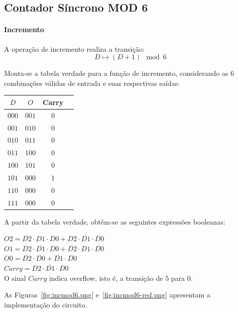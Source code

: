 \subsection{Contador Síncrono MOD 6}

\paragraph{Incremento}

A operação de incremento realiza a transição:
\[
D \mapsto (D + 1) \mod 6
\]

Monta-se a tabela verdade para a função de incremento, considerando as 6 combinações válidas de entrada e suas respectivas saídas:

\begin{center}
\begin{tabular}{c|ccc}
$D$ & $O$ & Carry \\
\hline
$000$ & $001$ & $0$ \\
$001$ & $010$ & $0$ \\
$010$ & $011$ & $0$ \\
$011$ & $100$ & $0$ \\
$100$ & $101$ & $0$ \\
$101$ & $000$ & $1$ \\
$110$ & $000$ & $0$ \\
$111$ & $000$ & $0$ \\
\end{tabular}
\end{center}

A partir da tabela verdade, obtêm-se as seguintes expressões booleanas:

$O2 =  \overline{D2}  \cdot D1 \cdot D0+D2 \cdot  \overline{D1}  \cdot  \overline{D0} $~\\
$O1 =  \overline{D2}  \cdot  \overline{D1}  \cdot D0+ \overline{D2}  \cdot D1 \cdot  \overline{D0} $~\\
$O0 =  \overline{D2}  \cdot  \overline{D0} + \overline{D1}  \cdot  \overline{D0} $~\\
$Carry = D2 \cdot  \overline{D1}  \cdot D0$~\\

O sinal $Carry$ indica overflow, isto é, a transição de $5$ para $0$.

As Figuras~\ref{fig:incmod6.png} e~\ref{fig:incmod6-red.png} apresentam a implementação do circuito.


